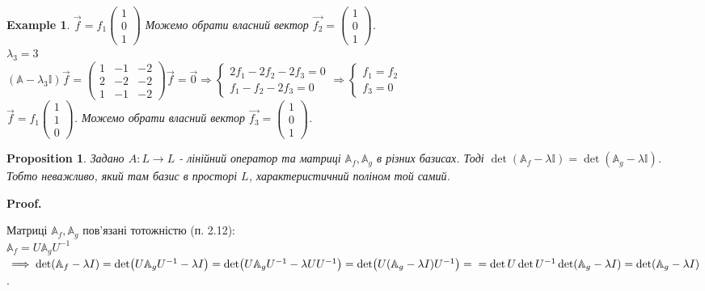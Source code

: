 \documentclass[a4paper, 10pt]{article}
\makeatletter
\theoremstyle{theoremdd}
\newtheorem{example}[theorem]{Example}
\newtheorem{proposition}[theorem]{Proposition}
\renewenvironment{proof}[1][Proof.\\]{\par
\pushQED{\hfill \qed}%
\normalfont \topsep6\p@\@plus6\p@\relax
\trivlist
\item\relax
{\bfseries
#1\@addpunct{.}}\hspace\labelsep\ignorespaces
}{%
\popQED\endtrivlist\@endpefalse
}
\makeatother
\begin{document}
\begin{example}
$\vec{f} = f_1 \begin{pmatrix}
1 \\ 0 \\ 1
\end{pmatrix}$ Можемо обрати власний вектор $\vec{f_2} = \begin{pmatrix}
1 \\ 0 \\ 1
\end{pmatrix}$.
\bigskip \\
$\lambda_3 = 3$\\
$(\mathbb{A} - \lambda_3 \mathbb{I})\vec{f} =\begin{pmatrix}
1 & -1 & -2 \\
2 & -2 & -2 \\
1 & -1 & -2
\end{pmatrix} \vec{f} = \vec{0} \Rightarrow \begin{cases} 2f_1 - 2f_2 - 2f_3 = 0 \\ f_1 - f_2 - 2f_3 = 0 \end{cases} \Rightarrow \begin{cases} f_1 = f_2 \\ f_3 = 0 \end{cases}$\\
$\vec{f} = f_1 \begin{pmatrix}
1 \\ 1 \\ 0
\end{pmatrix}$. Можемо обрати власний вектор $\vec{f_3} = \begin{pmatrix}
1 \\ 0 \\ 1
\end{pmatrix}$.
\end{example}

\begin{proposition}
\label{change_of_basis_characteristic_polynomial}
Задано $A: L \to L$ - лінійний оператор та матриці $\mathbb{A}_f, \mathbb{A}_g$ в різних базисах. Тоді $\det(\mathbb{A}_f - \lambda \mathbb{I}) = \det(\mathbb{A}_g - \lambda \mathbb{I})$.\\
Тобто неважливо, який там базис в просторі $L$, характеристичний поліном той самий.
\end{proposition}

\begin{proof}
Матриці $\mathbb{A}_f, \mathbb{A}_g$ пов'язані тотожністю (п. 2.12):\\
$\mathbb{A}_f = U \mathbb{A}_g U^{-1}$\\
$\implies \det(\mathbb{A}_f - \lambda I) = \det(U \mathbb{A}_g U^{-1} - \lambda I) = \det(U \mathbb{A}_g U^{-1} - \lambda U U^{-1}) = \det(U(\mathbb{A}_g-\lambda I)U^{-1}) = \\ = \det U \det U^{-1} \det (\mathbb{A}_g - \lambda I) = \det (\mathbb{A}_g - \lambda I)$.
\end{proof}
\end{document}
